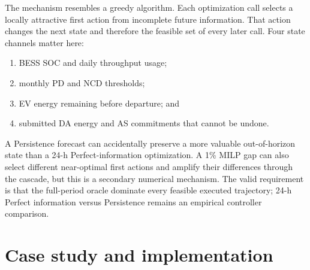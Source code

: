 \documentclass[final,5p,times]{elsarticle}
\begin{document}
The mechanism resembles a greedy algorithm. Each optimization call selects a locally
attractive first action from incomplete future information. That action changes
the next state and therefore the feasible set of every later call. Four state
channels matter here:
\begin{enumerate}
  \item BESS SOC and daily throughput usage;
  \item monthly PD and NCD thresholds;
  \item EV energy remaining before departure; and
  \item submitted DA energy and AS commitments that cannot be undone.
\end{enumerate}
A Persistence forecast can accidentally preserve a more valuable out-of-horizon
state than a 24-h Perfect-information optimization. A 1\% MILP gap can also
select different near-optimal first actions and amplify their differences
through the cascade, but this is a secondary numerical mechanism. The valid
requirement is that the full-period oracle dominate every feasible executed
trajectory; 24-h Perfect information versus Persistence remains an empirical
controller comparison.

\section{Case study and implementation}
\label{sec:case}
\label{sec:case_study}
\end{document}
